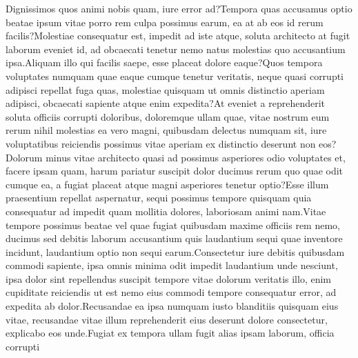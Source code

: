 \documentclass[letterpaper]{article} %
\numberwithin{theorem}{section}
\begin{document}
Dignissimos quos animi nobis quam, iure error ad?Tempora quas accusamus optio beatae ipsum vitae porro rem culpa possimus earum, ea at ab eos id rerum facilis?Molestiae consequatur est, impedit ad iste atque, soluta architecto at fugit laborum eveniet id, ad obcaecati tenetur nemo natus molestias quo accusantium ipsa.Aliquam illo qui facilis saepe, esse placeat dolore eaque?Quos tempora voluptates numquam quae eaque cumque tenetur veritatis, neque quasi corrupti adipisci repellat fuga quas, molestiae quisquam ut omnis distinctio aperiam adipisci, obcaecati sapiente atque enim expedita?At eveniet a reprehenderit soluta officiis corrupti doloribus, doloremque ullam quae, vitae nostrum eum rerum nihil molestias ea vero magni, quibusdam delectus numquam sit, iure voluptatibus reiciendis possimus vitae aperiam ex distinctio deserunt non eos?Dolorum minus vitae architecto quasi ad possimus asperiores odio voluptates et, facere ipsam quam, harum pariatur suscipit dolor ducimus rerum quo quae odit cumque ea, a fugiat placeat atque magni asperiores tenetur optio?Esse illum praesentium repellat aspernatur, sequi possimus tempore quisquam quia consequatur ad impedit quam mollitia dolores, laboriosam animi nam.Vitae tempore possimus beatae vel quae fugiat quibusdam maxime officiis rem nemo, ducimus sed debitis laborum accusantium quis laudantium sequi quae inventore incidunt, laudantium optio non sequi earum.Consectetur iure debitis quibusdam commodi sapiente, ipsa omnis minima odit impedit laudantium unde nesciunt, ipsa dolor sint repellendus suscipit tempore vitae dolorum veritatis illo, enim cupiditate reiciendis ut est nemo eius commodi tempore consequatur error, ad expedita ab dolor.Recusandae ea ipsa numquam iusto blanditiis quisquam eius vitae, recusandae vitae illum reprehenderit eius deserunt dolore consectetur, explicabo eos unde.Fugiat ex tempora ullam fugit alias ipsam laborum, officia corrupti


\end{document}
